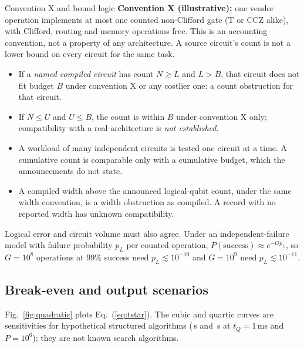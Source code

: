 \begin{rulebox}{Convention X and bound logic}
\textbf{Convention X (illustrative):} one vendor operation implements at most one counted non-Clifford gate (T or CCZ alike), with Clifford, routing and memory operations free. This is an accounting convention, not a property of any architecture. A source circuit's count is not a lower bound on every circuit for the same task.
\begin{itemize}
\item If a \emph{named compiled circuit} has count $N\ge L$ and $L>B$, that circuit does not fit budget $B$ under convention X or any costlier one: a count obstruction for that circuit.
\item If $N\le U$ and $U\le B$, the count is within $B$ under convention X only; compatibility with a real architecture is \emph{not established}.
\item A workload of many independent circuits is tested one circuit at a time. A cumulative count is comparable only with a cumulative budget, which the announcements do not state.
\item A compiled width above the announced logical-qubit count, under the same width convention, is a width obstruction as compiled. A record with no reported width has unknown compatibility.
\end{itemize}
\end{rulebox}
Logical error and circuit volume must also agree. Under an independent-failure model with failure probability $p_L$ per counted operation, $P(\text{success})\approx e^{-Gp_L}$, so $G=10^8$ operations at 99\% success need $p_L\lesssim10^{-10}$ and $G=10^9$ need $p_L\lesssim10^{-11}$.




\subsection{Break-even and output scenarios}
Fig.~\ref{fig:quadratic} plots Eq.~(\ref{eq:tstar}). The cubic and quartic curves are sensitivities for hypothetical structured algorithms (\beCubic\,s and \beQuartic\,s at $t_Q=1$\,ms and $P=10^6$); they are not known search algorithms.



